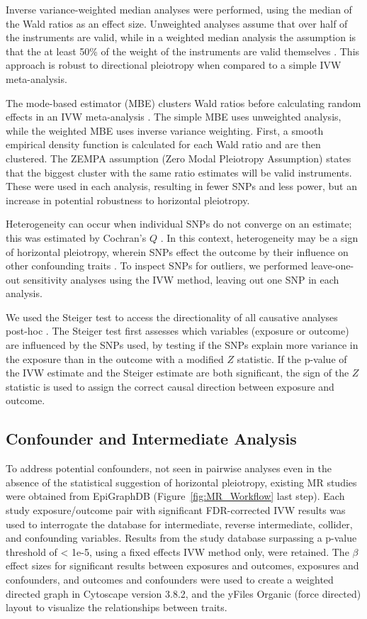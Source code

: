 \documentclass[journal,article,submit,moreauthors,pdftex]{Definitions/mdpi}
\begin{document}
Inverse variance-weighted median analyses were performed, using the median of the Wald ratios as an effect size. Unweighted analyses assume that over half of the instruments are valid, while in a weighted median analysis the assumption is that the at least 50\% of the weight of the instruments are valid themselves \cite{bowden_consistent_2016}. This approach is robust to directional pleiotropy when compared to a simple IVW meta-analysis.

The mode-based estimator (MBE) clusters Wald ratios before calculating random effects in an IVW meta-analysis \cite{hartwigRobustInferenceSummary2017a}. The simple MBE uses unweighted analysis, while the weighted MBE uses inverse variance weighting. First, a smooth empirical density function is calculated for each Wald ratio and are then clustered. The ZEMPA assumption (Zero Modal Pleiotropy Assumption) states that the biggest cluster with the same ratio estimates will be valid instruments. These were used in each analysis, resulting in fewer SNPs and less power, but an increase in potential robustness to horizontal pleiotropy.

Heterogeneity can occur when individual SNPs do not converge on an estimate; this was estimated by Cochran's $Q$ \cite{higgins_cochrane_2011}. In this context, heterogeneity may be a sign of horizontal pleiotropy, wherein SNPs effect the outcome by their influence on other confounding traits \cite{burgess_review_2017}. To inspect SNPs for outliers, we performed leave-one-out sensitivity analyses using the IVW method, leaving out one SNP in each analysis. 

We used the Steiger test to access the directionality of all causative analyses post-hoc \cite{hemaniOrientingCausalRelationship2017}. The Steiger test first assesses which variables (exposure or outcome) are influenced by the SNPs used, by testing if the SNPs explain more variance in the exposure than in the outcome with a modified $Z$ statistic. If the p-value of the IVW estimate and the Steiger estimate are both significant, the sign of the $Z$ statistic is used to assign the correct causal direction between exposure and outcome.

\subsection{Confounder and Intermediate Analysis}
To address potential confounders, not seen in pairwise analyses even in the absence of the statistical suggestion of horizontal pleiotropy, existing MR studies were obtained from EpiGraphDB (Figure~\ref{fig:MR_Workflow} last step). Each study exposure/outcome pair with significant FDR-corrected IVW results was used to interrogate the database for intermediate, reverse intermediate, collider, and confounding variables. Results from the study database surpassing a p-value threshold of < 1e-5, using a fixed effects IVW method only, were retained. The $\beta$ effect sizes for significant results between exposures and outcomes, exposures and confounders, and outcomes and confounders were used to create a weighted directed graph in Cytoscape \cite{shannon_cytoscape_2003} version 3.8.2, and the yFiles Organic (force directed) layout to visualize the relationships between traits. 
\end{document}
